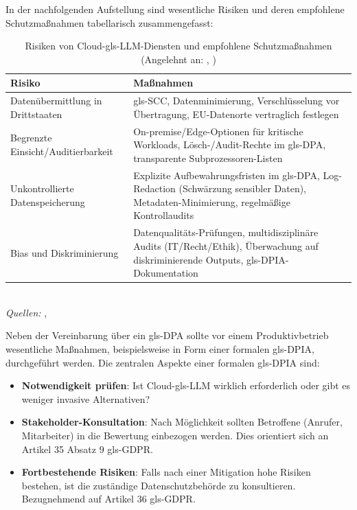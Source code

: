 In der nachfolgenden Aufstellung sind wesentliche Risiken und deren empfohlene Schutzma\ss nahmen tabellarisch zusammengefasst:

\begin{table}[H]
  \centering
  \caption[Risiken von Cloud-\gls{gls-LLM}-Diensten]{Risiken von Cloud-\gls{gls-LLM}-Diensten und empfohlene Schutzma\ss nahmen (Angelehnt an: \textcite{Data2025_AIDataQuality}, \textcite{ssrn5348245})}
  \label{tab:llm_risks}
  {\small
  \setlength{\extrarowheight}{4pt}
  \begin{tabular}{@{} >{\raggedright\arraybackslash}p{} >{\raggedright\arraybackslash}p{} @{} }
    \toprule
    \textbf{Risiko} & \textbf{Ma\ss nahmen} \\
    \midrule
    Datenübermittlung in Drittstaaten & \gls{gls-SCC}, Datenminimierung, Verschlüsselung vor Übertragung, EU-Datenorte vertraglich festlegen \\
    \addlinespace[2pt]
    Begrenzte Einsicht/Auditierbarkeit & On-premise/Edge-Optionen für kritische Workloads, Lösch-/Audit-Rechte im \gls{gls-DPA}, transparente Subprozessoren-Listen \\
    \addlinespace[2pt]
    Unkontrollierte Datenspeicherung & Explizite Aufbewahrungsfristen im \gls{gls-DPA}, Log-Redaction (Schwärzung sensibler Daten), Metadaten-Minimierung, regelmä\ss ige Kontrollaudits \\
    \addlinespace[2pt]
    Bias und Diskriminierung & Datenqualitäts-Prüfungen, multidisziplinäre Audits (IT/Recht/Ethik), Überwachung auf diskriminierende Outputs, \gls{gls-DPIA}-Dokumentation \\
  \end{tabular}
  }
  \\[1em]
  \footnotesize{\textit{Quellen:} \textcite{ssrn5348245}, \textcite{Data2025_AIDataQuality}}
\end{table}

Neben der Vereinbarung über ein \gls{gls-DPA} sollte vor einem Produktivbetrieb wesentliche Ma\ss nahmen, beispielsweise in Form einer formalen \gls{gls-DPIA}, durchgeführt werden. Die zentralen Aspekte einer formalen \gls{gls-DPIA} sind:
\begin{itemize}
  \item \textbf{Notwendigkeit prüfen}: Ist Cloud-\gls{gls-LLM} wirklich erforderlich oder gibt es weniger invasive Alternativen?
  \item \textbf{Stakeholder-Konsultation}: Nach Möglichkeit sollten Betroffene (Anrufer, Mitarbeiter) in die Bewertung einbezogen werden. Dies orientiert sich an Artikel 35 Absatz 9 \gls{gls-GDPR}.
  \item \textbf{Fortbestehende Risiken}: Falls nach einer Mitigation hohe Risiken bestehen, ist die zuständige Datenschutzbehörde zu konsultieren. Bezugnehmend auf Artikel 36 \gls{gls-GDPR}.
\end{itemize}

